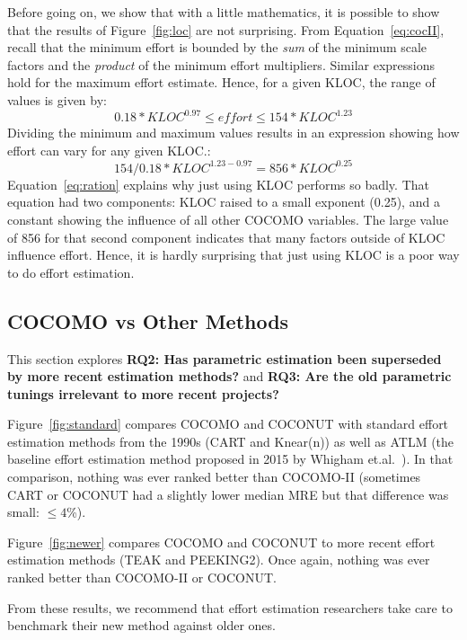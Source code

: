 \documentclass[smallcondesed]{svjour3}
\newcommand{\fig}[1]{Figure~\ref{fig:#1}}
\newcommand{\eq}[1]{Equation~\ref{eq:#1}}
\newenvironment{BLUE}{\color{blue}}{\ignorespacesafterend}
\newcommand{\HERE}[1]{\label{err:#1}
 \reversemarginpar\marginnote{\textcolor{blue}{(#1)}}}
\begin{document}
 Before going on, we show that with a little
 mathematics, it is possible to show
 that the results of \fig{loc} are not surprising.
 From \eq{cocII}, recall that
the minimum  
effort  is bounded by the  {\em sum} of the minimum scale factors
and the {\em product} of the minimum effort multipliers.
Similar expressions hold for the  maximum effort estimate. Hence,
for a given KLOC, the range of values is given by:
\[
0.18*\mathit{KLOC}^{0.97}  \le \mathit{effort} \le 154*\mathit{KLOC}^{1.23}\]
Dividing the minimum and maximum values results in an  expression showing
how    effort can vary for any given KLOC.: 
\begin{equation}\label{eq:ration}
154/0.18 *\mathit{KLOC}^{1.23 - 0.97} = 856*\mathit{KLOC}^{0.25}
\end{equation} 
 \eq{ration} explains why just using KLOC performs so badly. 
That equation had two components: KLOC raised to
a small exponent (0.25), and a constant showing the influence of all  other
COCOMO variables. The large value of 856 for that second component
indicates that many factors outside of KLOC influence effort. Hence, it is hardly
surprising that just using KLOC is a poor way to do effort estimation.

 

\subsection{COCOMO vs Other Methods}\label{sect:othermethods}
This section explores {\bf RQ2: 
Has parametric estimation been superseded
by more recent estimation methods?}
and {\bf RQ3: Are the old parametric tunings irrelevant to
more recent projects?}


\fig{standard} compares COCOMO and COCONUT with  
standard effort estimation methods
from the 1990s (CART and Knear(n))
\begin{BLUE}\HERE{Reviewer2f}
  as well as  ATLM (the baseline effort estimation method
  proposed in 2015 by Whigham et.al.~\cite{whigham15}).
  \end{BLUE}
In that comparison, nothing was ever ranked better than COCOMO-II
(sometimes
CART or COCONUT had a slightly lower median MRE but that difference was small: $\le 4$\%).

\fig{newer} compares COCOMO and COCONUT to more recent effort estimation methods (TEAK and PEEKING2). Once again,   nothing was ever ranked better than COCOMO-II or COCONUT.


From these results,
we recommend that effort estimation researchers take care to benchmark
their new method against older ones.
\end{document}
